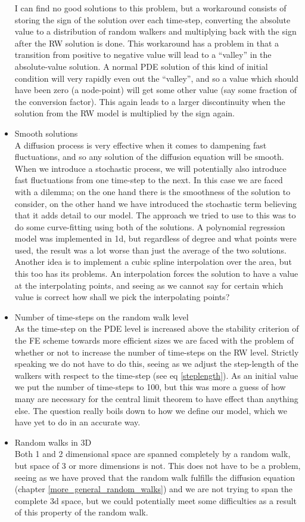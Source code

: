 \begin{itemize}
 I can find no good solutions to this problem, but a workaround consists of storing the sign of the solution over each time-step, converting the absolute value to a distribution of random walkers and multiplying back with the sign after the RW solution is done. 
 This workaround has a problem in that a transition from positive to negative value will lead to a ``valley'' in the absolute-value solution. 
 A normal PDE solution of this kind of initial condition will very rapidly even out the ``valley'', and so a value which should have been zero (a node-point) will get some other value (say some fraction of the conversion factor). This again leads to a larger discontinuity when the solution from the RW model is multiplied by the sign again.
 \item Smooth solutions\\
 A diffusion process is very effective when it comes to dampening fast fluctuations, and so any solution of the diffusion equation will be smooth. 
 When we introduce a stochastic process, we will potentially also introduce fast fluctuations from one time-step to the next. 
 In this case we are faced with a dilemma; on the one hand there is the smoothness of the solution to consider, on the other hand we have introduced the stochastic term believing that it adds detail to our model. 
 The approach we tried to use to this was to do some curve-fitting using both of the solutions. 
 A polynomial regression model was implemented in 1d, but regardless of degree and what points were used, the result was a lot worse than just the average of the two solutions. 
 Another idea is to implement a cubic spline interpolation over the area, but this too has its problems. An interpolation forces the solution to have a value at the interpolating points, and seeing as we cannot say for certain which value is correct how shall we pick the interpolating points?
 \item Number of time-steps on the random walk level\\
 As the time-step on the PDE level is increased above the stability criterion of the FE scheme towards more efficient sizes we are faced with the problem of whether or not to increase the number of time-steps on the RW level. 
 Strictly speaking we do not have to do this, seeing as we adjust the step-length of the walkers with respect to the time-step (see eq \ref{steplength}). 
 As an initial value we put the number of time-steps to 100, but this was more a guess of how many are necessary for the central limit theorem to have effect than anything else. 
 The question really boils down to how we define our model, which we have yet to do in an accurate way.
 \item Random walks in 3D\\
 Both 1 and 2 dimensional space are spanned completely by a random walk, but space of 3 or more dimensions is not. 
 This does not have to be a problem, seeing as we have proved that the random walk fulfills the diffusion equation (chapter \ref{more_general_random_walks}) and we are not trying to span the complete 3d space, but we could potentially meet some difficulties as a result of this property of the random walk.
\end{itemize}

